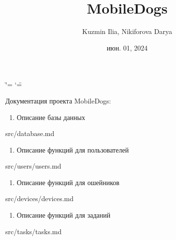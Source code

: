 \documentclass[letterpaper,10pt,russian]{sphinxmanual}
\title{MobileDogs}
\date{июн. 01, 2024}
\author{Kuzmin Ilia, Nikiforova Darya}
\begin{document}
\ifdefined\shorthandoff
  \ifnum\catcode`\=\string=\active\shorthandoff{=}\fi
  \ifnum\catcode`\"=\active{}\fi
\fi

\pagestyle{empty}
\sphinxmaketitle
\pagestyle{plain}
\sphinxtableofcontents
\pagestyle{normal}
\label{\detokenize{index::doc}}
\sphinxAtStartPar
Документация проекта MobileDogs:
\begin{enumerate}
%
\item {} 
\sphinxAtStartPar
Описание базы данных

\end{enumerate}

\sphinxAtStartPar
src/database.md
\begin{enumerate}
%
\setcounter{enumi}{1}
\item {} 
\sphinxAtStartPar
Описание функций для пользователей

\end{enumerate}

\sphinxAtStartPar
src/users/users.md
\begin{enumerate}
%
\setcounter{enumi}{2}
\item {} 
\sphinxAtStartPar
Описание функций для ошейников

\end{enumerate}

\sphinxAtStartPar
src/devices/devices.md
\begin{enumerate}
%
\setcounter{enumi}{3}
\item {} 
\sphinxAtStartPar
Описание функций для заданий

\end{enumerate}

\sphinxAtStartPar
src/tasks/tasks.md
\begin{description}
\begin{quote}\begin{description}
\end{description}\end{quote}

\end{description}

\sphinxstepscope
\end{document}

